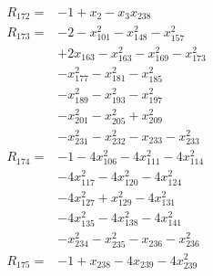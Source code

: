 \begin{align*}
R_{172}={}&-1 +x_{2} -x_{3}x_{238}\\[3pt]
R_{173}={}&-2 -x_{101}^{2} -x_{148}^{2} -x_{157}^{2}\\
&+2x_{163} -x_{163}^{2} -x_{169}^{2} -x_{173}^{2}\\
&-x_{177}^{2} -x_{181}^{2} -x_{185}^{2}\\
&-x_{189}^{2} -x_{193}^{2} -x_{197}^{2}\\
&-x_{201}^{2} -x_{205}^{2} +x_{209}^{2}\\
&-x_{231}^{2} -x_{232}^{2} -x_{233} -x_{233}^{2}\\[3pt]
R_{174}={}&-1 -4x_{106}^{2} -4x_{111}^{2} -4x_{114}^{2}\\
&-4x_{117}^{2} -4x_{120}^{2} -4x_{124}^{2}\\
&-4x_{127}^{2} +x_{129}^{2} -4x_{131}^{2}\\
&-4x_{135}^{2} -4x_{138}^{2} -4x_{141}^{2}\\
&-x_{234}^{2} -x_{235}^{2} -x_{236} -x_{236}^{2}\\[3pt]
R_{175}={}&-1 +x_{238} -4x_{239} -4x_{239}^{2}\\[3pt]
\end{align*}
